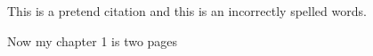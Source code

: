

This is a pretend citation\cite{Murrayb} and this is an incorrectly spelled words.

\newpage
Now my chapter 1 is two pages